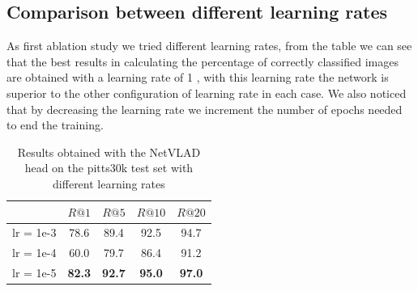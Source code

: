 \documentclass[10pt,twocolumn,letterpaper]{article}
\begin{document}
\subsection{Comparison between different learning rates}
As first ablation study we tried different learning rates, from the table we can see that the best results in calculating the percentage of correctly classified images are obtained with a learning rate of 1 , with this learning rate the network is superior to the other configuration of learning rate in each case. We also noticed that by decreasing the learning rate we increment the number of epochs needed to end the training.
\begin{table}[!h]
	\centering
	\begin{tabular}{|l|c|c|c|c|}
		\hline
		&          $R@1$  &        $R@5$  &        $R@10$ &        $R@20$   \\ \hline     
		lr = 1e-3 &         78.6    &    89.4       &    92.5       &         94.7       \\
		lr = 1e-4 &         60.0    &         79.7  & 86.4 & 91.2  \\    
		lr = 1e-5 & \textbf{82.3}   & \textbf{92.7} &         \textbf{95.0}  & \textbf{97.0}          \\
		\hline
	\end{tabular}
	\caption{Results obtained with the NetVLAD head on the pitts30k test set with different learning rates}
	\label{tab:NETVLAD:lr}
\end{table}
\end{document}
